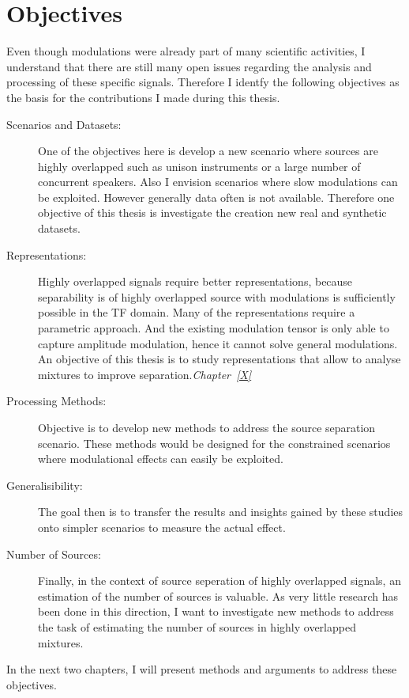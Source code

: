\section{Objectives}

Even though modulations were already part of many scientific activities, I understand that there are still many open issues regarding the analysis and processing of these specific signals.
Therefore I identfy the following objectives as the basis for the contributions I made during this thesis.
\begin{description}
  \item[Scenarios and Datasets:] One of the objectives here is develop a new scenario where sources are highly overlapped such   as unison instruments or a large number of concurrent speakers. Also I envision scenarios where slow modulations can be      exploited. However generally data often is not available. Therefore one objective of this thesis is investigate the          creation new real and synthetic datasets.
  \item[Representations:] Highly overlapped signals require better representations, because separability is of highly overlapped source with modulations is sufficiently possible in the TF domain.
    Many of the representations require a parametric approach. And the existing modulation tensor is only able to capture amplitude modulation, hence it cannot solve general modulations.
    An objective of this thesis is to study representations that allow to analyse mixtures to improve separation.\emph{Chapter~\ref{X}}
  \item[Processing Methods:] Objective is to develop new methods to address the source separation scenario. These methods would be designed for the constrained scenarios where modulational effects can easily be exploited.
  \item[Generalisibility:] The goal then is to transfer the results and insights gained by these
    studies onto simpler scenarios to measure the actual effect.
  \item[Number of Sources:] Finally, in the context of source seperation of highly overlapped signals, an estimation of the number of sources is valuable. As very little research has been done in this direction, I want to investigate new methods to address the task of estimating the number of sources in highly overlapped mixtures.
\end{description}

In the next two chapters, I will present methods and arguments to address these objectives.

